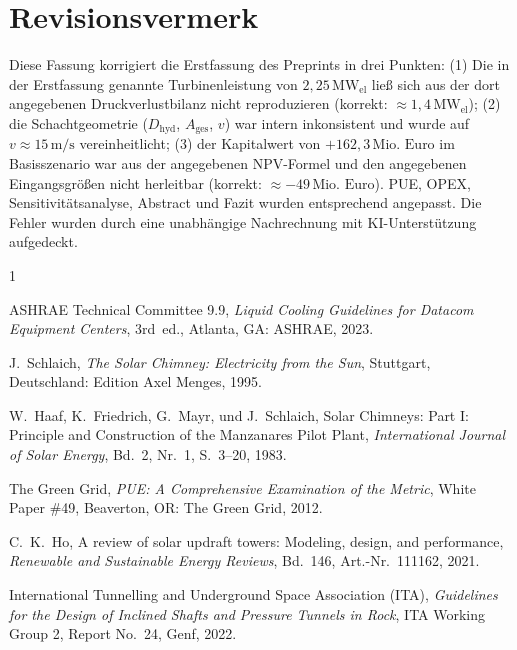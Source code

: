 \documentclass[journal]{IEEEtran}
\begin{document}
\section*{Revisionsvermerk}
Diese Fassung korrigiert die Erstfassung des Preprints in drei Punkten: (1) Die in der Erstfassung genannte Turbinenleistung von $2{,}25\,\text{MW}_{\text{el}}$ ließ sich aus der dort angegebenen Druckverlustbilanz nicht reproduzieren (korrekt: $\approx 1{,}4\,\text{MW}_{\text{el}}$); (2) die Schachtgeometrie ($D_{\text{hyd}}$, $A_{\text{ges}}$, $v$) war intern inkonsistent und wurde auf $v \approx 15\,\text{m/s}$ vereinheitlicht; (3) der Kapitalwert von $+162{,}3\,\text{Mio. Euro}$ im Basisszenario war aus der angegebenen NPV-Formel und den angegebenen Eingangsgrößen nicht herleitbar (korrekt: $\approx -49\,\text{Mio. Euro}$). PUE, OPEX, Sensitivitätsanalyse, Abstract und Fazit wurden entsprechend angepasst. Die Fehler wurden durch eine unabhängige Nachrechnung mit KI-Unterstützung aufgedeckt.

\begin{thebibliography}{1}

ASHRAE Technical Committee 9.9, \emph{Liquid Cooling Guidelines for Datacom Equipment Centers}, 3rd~ed., Atlanta, GA: ASHRAE, 2023.

J.~Schlaich, \emph{The Solar Chimney: Electricity from the Sun}, Stuttgart, Deutschland: Edition Axel Menges, 1995.

W.~Haaf, K.~Friedrich, G.~Mayr, und J.~Schlaich, \glqq{}Solar Chimneys: Part I: Principle and Construction of the Manzanares Pilot Plant\grqq{}, \emph{International Journal of Solar Energy}, Bd.~2, Nr.~1, S.~3--20, 1983.

The Green Grid, \emph{PUE: A Comprehensive Examination of the Metric}, White Paper \#49, Beaverton, OR: The Green Grid, 2012.

C.~K.~Ho, \glqq{}A review of solar updraft towers: Modeling, design, and performance\grqq{}, \emph{Renewable and Sustainable Energy Reviews}, Bd.~146, Art.-Nr.~111162, 2021.

International Tunnelling and Underground Space Association (ITA), \emph{Guidelines for the Design of Inclined Shafts and Pressure Tunnels in Rock}, ITA Working Group 2, Report No.~24, Genf, 2022.

\end{thebibliography}
\end{document}
